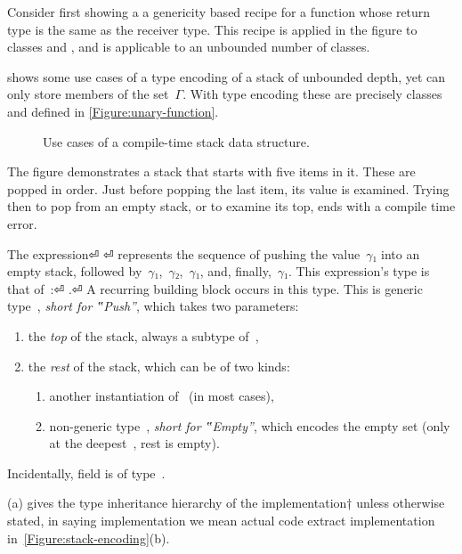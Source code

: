 Consider first  showing a a genericity based recipe for 
  a function whose return type 
  is the same as the receiver type.
This recipe is applied in the figure to classes  and , and 
  is applicable to an unbounded number of classes.

 shows some use cases of a type encoding of
  a stack of unbounded depth, yet can only store members of the set~$Γ$.
With type encoding these are precisely classes~
  and  defined in \cref{Figure:unary-function}.

\begin{figure}[htb]
  \caption{\label{Figure:stack-use-cases}%
    Use cases of a compile-time stack data structure.
  }
\end{figure}

The figure demonstrates a stack that starts with five items in it.
These are popped in order. Just before popping the last item, its
  value is examined.
Trying then to pop from an empty stack, or to examine its top, ends with
  a compile time error.

The expression⏎
  \mbox{\qquad\qquad} ⏎
represents the sequence of pushing the value~$γ₁$ into an
empty stack, followed by~$γ₁$,~$γ₂$,~$γ₁$, and, finally,~$γ₁$.
This expression's type is that of~:⏎
\mbox{\qquad\qquad} .⏎
A recurring building block occurs in this type.
This is generic type~, \emph{short for ‟Push”}, which takes two parameters:
  \begin{enumerate}
    \item the \emph{top} of the stack, always a subtype of~,
    \item the \emph{rest} of the stack, which can be of two kinds:
          \begin{enumerate}
            \item another instantiation of~ (in most cases),
            \item non-generic type~, \emph{short for ‟Empty”}, which encodes the empty
                  set (only at the deepest~, rest is empty).
          \end{enumerate}
  \end{enumerate}
Incidentally,  field  is of type~.

(a) gives the type inheritance hierarchy of the \Java
implementation†{%
  unless otherwise stated, in saying implementation we mean actual
  code extract
}
implementation in~\cref{Figure:stack-encoding}(b).

